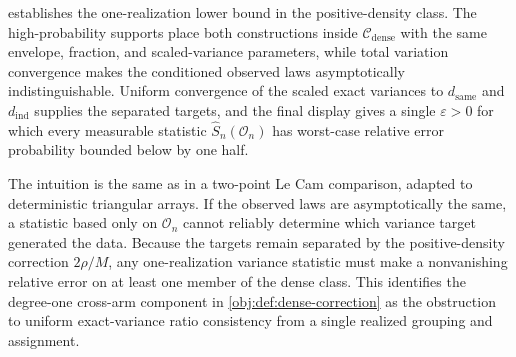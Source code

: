  establishes the one-realization lower bound in the positive-density class. The high-probability supports place both constructions inside \(\mathcal C_{\mathrm{dense}}\) with the same envelope, fraction, and scaled-variance parameters, while total variation convergence makes the conditioned observed laws asymptotically indistinguishable. Uniform convergence of the scaled exact variances to \(d_{\mathrm{same}}\) and \(d_{\mathrm{ind}}\) supplies the separated targets, and the final display gives a single \(\varepsilon>0\) for which every measurable statistic \(\widehat S_n(\mathcal O_n)\) has worst-case relative error probability bounded below by one half.

The intuition is the same as in a two-point Le Cam comparison, adapted to deterministic triangular arrays. If the observed laws are asymptotically the same, a statistic based only on \(\mathcal O_n\) cannot reliably determine which variance target generated the data. Because the targets remain separated by the positive-density correction \(2\rho/M\), any one-realization variance statistic must make a nonvanishing relative error on at least one member of the dense class. This identifies the degree-one cross-arm component in \cref{obj:def:dense-correction} as the obstruction to uniform exact-variance ratio consistency from a single realized grouping and assignment.
